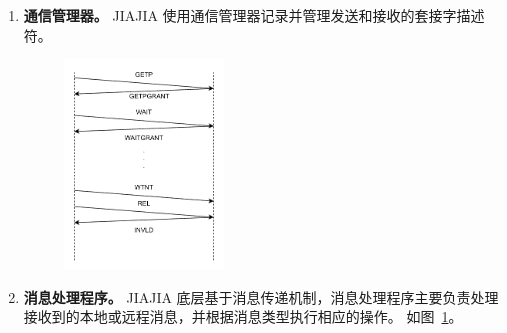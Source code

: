 {\begin{enumerate}[label=\arabic*.]
        \item \textbf{通信管理器。} JIAJIA 使用通信管理器记录并管理发送和接收的套接字描述符。

              \begin{figure}[!htbp]
                  \centering
                  \includegraphics[width=0.4\textwidth]{Img/JIAJIA底层消息传递机制.drawio.pdf}
                  \label{fig:JIAJIA-message-handle}
              \end{figure}
        \item \textbf{消息处理程序。} JIAJIA 底层基于消息传递机制，消息处理程序主要负责处理接收到的本地或远程消息，并根据消息类型执行相应的操作。
              如图~\ref{fig:JIAJIA-message-handle}。




\end{enumerate}}
